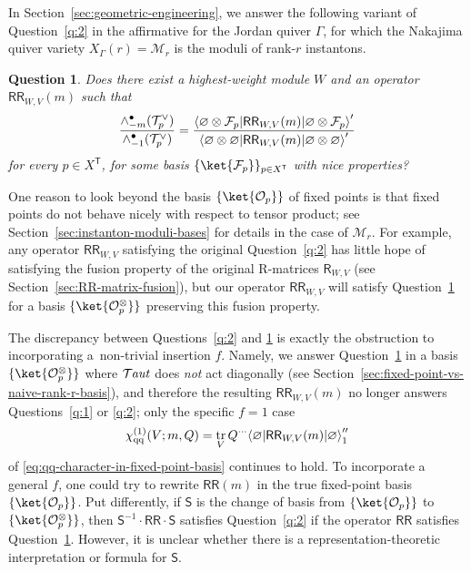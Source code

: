 \documentclass[pdftex]{sigma}%
\numberwithin{equation}{section}
\newtheorem{question}[Theorem]{Question}
\newcommand{\cF}{\mathcal{F}}
\newcommand{\cM}{\mathcal{M}}
\newcommand{\cO}{\mathcal{O}}
\newcommand{\cT}{\mathcal{T}}
\newcommand{\kQ}{Q}
\newcommand{\sT}{\mathsf{T}}
\newcommand{\sR}{\mathsf{R}}
\newcommand{\sS}{\mathsf{S}}
\newcommand{\sRR}{\mathsf{RR}}
\newcommand{\chiqq}{\chi_{\mathrm{qq}}}
\DeclareMathOperator{\Taut}{\mathcal{T}\mkern-1.5mu{\mathit{aut}}}
\DeclareMathOperator{\tr}{tr}
\DeclarePairedDelimiter{\inner}{\langle}{\rangle}
\begin{document}
\begin{MyParagraph}
In Section~\ref{sec:geometric-engineering}, we answer the following variant
of Question~\ref{q:2} in the affirmative for the Jordan quiver $\Gamma$,
for which the Nakajima quiver variety $X_\Gamma(r) = \cM_r$ is the moduli
of rank-$r$ instantons.

\begin{question} \label{q:2p}
 Does there exist a highest-weight module $W$ and an operator
 $\sRR_{W,V}(m)$ such that
 \[ \frac{\wedge_{-m}^\bullet(\cT_p^\vee)}{\wedge_{-1}^\bullet(\cT_p^\vee)} = \frac{\inner*{\varnothing \otimes \cF_p | \sRR_{W,V}(m) | \varnothing \otimes \cF_p}'}{\inner*{\varnothing \otimes \varnothing | \sRR_{W,V}(m) | \varnothing \otimes \varnothing}'} \]
 for every $p \in X^{\sT}$, for some basis
 $\{\ket{\cF_p}\}_{p \in X^{\sT}}$ with nice properties?
\end{question}

One reason to look beyond the basis $\{\ket{\cO_p}\}$ of fixed points
is that fixed points do not behave nicely with respect to tensor
product; see Section~\ref{sec:instanton-moduli-bases} for details in the
case of $\cM_r$. For example, any operator $\sRR_{W,V}$ satisfying the
original Question~\ref{q:2} has little hope of satisfying the fusion
property of the original R-matrices $\sR_{W,V}$ (see
Section~\ref{sec:RR-matrix-fusion}), but our operator $\sRR_{W,V}$ will
satisfy Question~\ref{q:2p} for a basis $\{\ket{\cO^{\otimes}_p}\}$
preserving this fusion property.
\end{MyParagraph}

\begin{MyParagraph}
The discrepancy between Questions~\ref{q:2} and \ref{q:2p} is exactly
the obstruction to incorporating a~non-trivial insertion $f$. Namely,
we answer Question~\ref{q:2p} in a basis $\{\ket{\cO_p^\otimes}\}$
where $\Taut$ does {\it not} act diagonally (see
Section~\ref{sec:fixed-point-vs-naive-rank-r-basis}), and therefore the
resulting $\sRR_{W,V}(m)$ no longer answers Questions~\ref{q:1} or
\ref{q:2}; only the specific $f=1$ case
\[ \chiqq^{(1)}(V; m, \kQ) = \tr_V \kQ^{\cdots} \inner*{\varnothing | \sRR_{W,V}(m) | \varnothing}_1'' \]
of \eqref{eq:qq-character-in-fixed-point-basis} continues to hold. To
incorporate a general $f$, one could try to rewrite $\sRR(m)$ in the
true fixed-point basis $\{\ket{\cO_p}\}$. Put differently, if $\sS$ is
the change of basis from $\{\ket{\cO_p}\}$ to
$\{\ket{\cO_p^\otimes}\}$, then $\sS^{-1}\cdot \sRR\cdot \sS$
satisfies Question~\ref{q:2} if the operator $\sRR$ satisfies
Question~\ref{q:2p}. However, it is unclear whether there is a
representation-theoretic interpretation or formula for $\sS$.
\end{MyParagraph}
\end{document}
